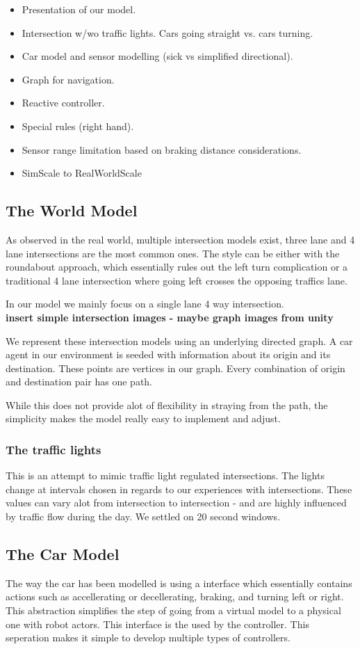 \begin{itemize}
\item Presentation of our model.
\item Intersection w/wo traffic lights. Cars going straight vs. cars turning.
\item Car model and sensor modelling (sick vs simplified directional).
\item Graph for navigation.
\item Reactive controller.
\item Special rules (right hand).
\item Sensor range limitation based on braking distance considerations.
\item SimScale to RealWorldScale
\end{itemize}

\subsection{The World Model}
As observed in the real world, multiple intersection models exist, three lane and 4 lane intersections are the most common ones.
The style can be either with the roundabout approach, which essentially rules out the left turn complication or a traditional 4 lane intersection where going left crosses the opposing traffics lane.

In our model we mainly focus on a single lane 4 way intersection.\\
\textbf{insert simple intersection images - maybe graph images from unity}

We represent these intersection models using an underlying directed graph.
 A car agent in our environment is seeded with information about its origin and its destination.
These points are vertices in our graph. 
Every combination of origin and destination pair has one path.

While this does not provide alot of flexibility in straying from the path, the simplicity makes the model really easy to implement and adjust.

\subsubsection{The traffic lights}
This is an attempt to mimic traffic light regulated intersections.
 The lights change at intervals chosen in regards to our experiences with intersections. 
 These values can vary alot from intersection to intersection - and are highly influenced by traffic flow during the day. 
 We settled on 20 second windows.


\subsection{The Car Model}
The way the car has been modelled is using a interface which essentially contains actions such as accellerating or decellerating, braking, and turning left or right.
This abstraction simplifies the step of going from a virtual model to a physical one with robot actors.
This interface is the used by the controller. This seperation makes it simple to develop multiple types of controllers.